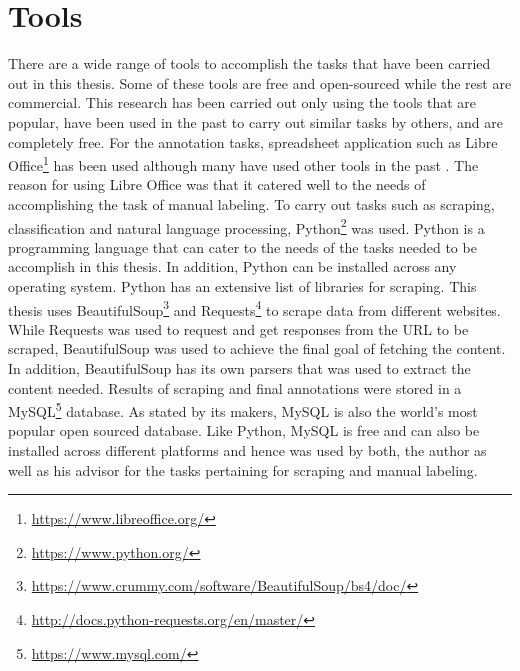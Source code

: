 \documentclass[a4paper,12pt,twoside]{report}
\begin{document}
\section{Tools}
There are a wide range of tools to accomplish the tasks that have been carried out in this thesis. Some of these tools are free and open-sourced while the rest are commercial. This research has been carried out only using the tools that are popular, have been used in the past to carry out similar tasks by others, and are completely free. 
\newline \newline
For the annotation tasks, spreadsheet application such as Libre Office\footnote{\url{https://www.libreoffice.org/}} has been used although many have used other tools in the past \cite{Lata2016}\cite{Nonnenmacher2017}. The reason for using Libre Office was that it catered well to the needs of accomplishing the task of manual labeling. 
\newline \newline
To carry out tasks such as scraping, classification and natural language processing, Python\footnote{\url{https://www.python.org/}} was used. Python is a programming language that can cater to the needs of the tasks needed to be accomplish in this thesis. In addition, Python can be installed across any operating system. Python has an extensive list of libraries for scraping. This thesis uses BeautifulSoup\footnote{\url{https://www.crummy.com/software/BeautifulSoup/bs4/doc/}} and Requests\footnote{\url{http://docs.python-requests.org/en/master/}} to scrape data from different websites. While Requests was used to request and get responses from the URL to be scraped, BeautifulSoup was used to achieve the final goal of fetching the content. In addition, BeautifulSoup has its own parsers that was used to extract the content needed.
\newline \newline
Results of scraping and final annotations were stored in a MySQL\footnote{\url{https://www.mysql.com/}} database. As stated by its makers, MySQL is also the world's most popular open sourced database. Like Python, MySQL is free and can also be installed across different platforms and hence was used by both, the author as well as his advisor for the tasks pertaining for scraping and manual labeling. 
\newline \newline
\end{document}
